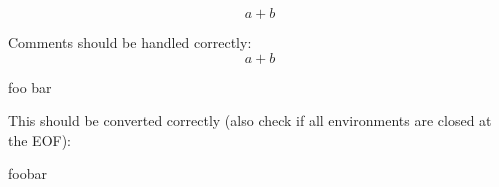 \begin{equation*}
  \label{eq:test}
  a + b
\end{equation*}


Comments should be handled correctly:
\begin{equation} %
  a + b
\end{equation}
\begin{remark} %
  foo bar
\end{remark}

This should be converted correctly (also check if all environments are closed at the EOF):
\begin{a}
  \begin{b}
    \begin{c}
      \begin{d}
        \begin{e}
          \begin{f}
            \begin{g}
              \begin{h}
                \begin{i}
                  foobar
                \end{i}
              \end{h}
            \end{g}
          \end{f}
        \end{e}
      \end{d}
    \end{c}
  \end{b}
\end{a}
